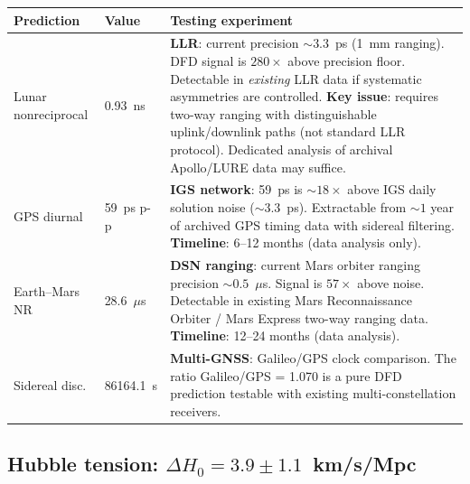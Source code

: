 \documentclass[11pt]{article}
\newcommand{\Hzero}{H_0}
\begin{document}
\begin{table}[H]
\centering
\begin{tabular}{p{3cm}p{3cm}p{6cm}}
\toprule
\textbf{Prediction} & \textbf{Value} & \textbf{Testing experiment} \\
\midrule
Lunar nonreciprocal & 0.93~ns &
  \textbf{LLR}: current precision $\sim 3.3$~ps (1~mm ranging).
  DFD signal is $280\times$ above precision floor. Detectable in
  \emph{existing} LLR data if systematic asymmetries are controlled.
  \textbf{Key issue}: requires two-way ranging with distinguishable
  uplink/downlink paths (not standard LLR protocol). Dedicated analysis
  of archival Apollo/LURE data may suffice. \\
\addlinespace
GPS diurnal & 59~ps p-p &
  \textbf{IGS network}: 59~ps is $\sim 18\times$ above IGS daily
  solution noise ($\sim 3.3$~ps). Extractable from $\sim 1$ year of
  archived GPS timing data with sidereal filtering.
  \textbf{Timeline}: 6--12 months (data analysis only). \\
\addlinespace
Earth--Mars NR & 28.6~$\mu$s &
  \textbf{DSN ranging}: current Mars orbiter ranging precision
  $\sim 0.5$~$\mu$s. Signal is $57\times$ above noise.
  Detectable in existing Mars Reconnaissance Orbiter / Mars Express
  two-way ranging data. \textbf{Timeline}: 12--24 months (data
  analysis). \\
\addlinespace
Sidereal disc. & 86164.1~s &
  \textbf{Multi-GNSS}: Galileo/GPS clock comparison. The ratio
  Galileo/GPS = 1.070 is a pure DFD prediction testable with
  existing multi-constellation receivers. \\
\bottomrule
\end{tabular}
\end{table}

\subsection{Hubble tension: $\Delta\Hzero = 3.9 \pm 1.1$~km/s/Mpc}
\end{document}
